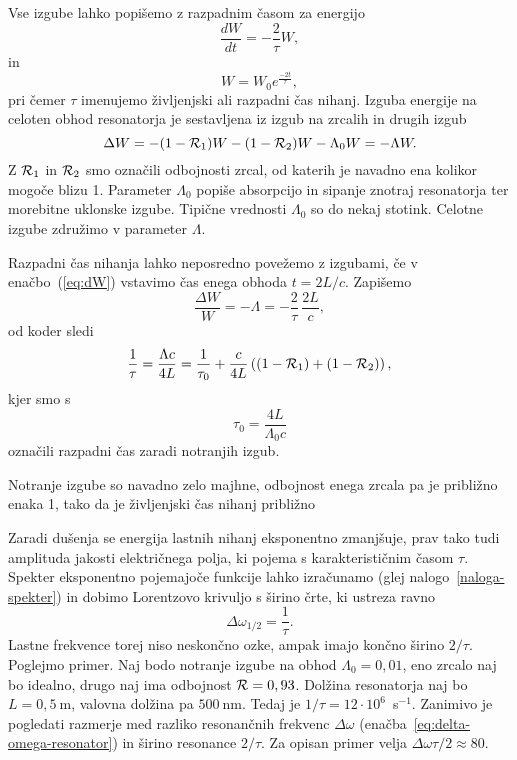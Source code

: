 Vse izgube lahko popišemo z razpadnim časom za energijo 
\begin{equation}
\frac{dW}{dt}=-\frac{2}{\tau}W,
\label{eq:dW}
\end{equation}
in 
\begin{equation}
W = W_0 e^{\frac{-2t}{\tau}},
\label{eq:dW1}
\end{equation}
pri čemer $\tau$ imenujemo življenjski ali razpadni čas nihanj.
Izguba energije na celoten obhod resonatorja je
sestavljena iz izgub na zrcalih in drugih izgub
\begin{equation}
\Delta W = -(1-{\cal R}_{1})W-(1-{\cal R}_{2})W -\Lambda_{0} W = -\Lambda W.
\label{eq:Lambda}
\end{equation}
Z ${\cal R}_{1}$ in ${\cal R}_{2}$ smo označili odbojnosti zrcal, od katerih je navadno ena
kolikor mogoče blizu 1. Parameter $\Lambda_{0}$ popiše absorpcijo in
sipanje znotraj resonatorja ter morebitne uklonske izgube. Tipične vrednosti 
$\Lambda_0$ so do nekaj stotink. Celotne izgube združimo v parameter $\Lambda$. 

Razpadni čas nihanja lahko neposredno povežemo z izgubami, če v enačbo~(\ref{eq:dW})
vstavimo čas enega obhoda $t=2L/c$. Zapišemo
\begin{equation}
\frac{\Delta W}{W}= -\Lambda = -\frac{2}{\tau}\, \frac{2L}{c},
\end{equation}
od koder sledi
\begin{equation}
\frac{1}{\tau}=\frac{\Lambda c}{4L}=\frac{1}{\tau_{0}}+\frac{c}{4L}\left((1-{\cal R}_{1})
+(1-{\cal R}_{2})\right),
\label{taulambda}
\end{equation}
kjer smo s 
\begin{equation}
\tau_{0}=\frac{4L}{\Lambda_0 c}
\end{equation}
označili razpadni čas zaradi notranjih izgub. 

Notranje izgube so navadno zelo majhne, odbojnost enega zrcala
pa je približno enaka 1, tako da je življenjski čas nihanj približno

Zaradi dušenja se energija lastnih nihanj eksponentno zmanjšuje, prav tako tudi
amplituda jakosti električnega polja, ki pojema s karakterističnim časom $\tau$. 
Spekter eksponentno pojemajoče funkcije lahko izračunamo
(glej nalogo~\ref{naloga-spekter}) in dobimo Lorentzovo krivuljo 
s širino črte, ki ustreza ravno
\begin{equation}
\Delta\omega_{1/2}=\frac{1}{\tau}.
\label{3.26}
\end{equation}
Lastne frekvence torej niso neskončno ozke, ampak imajo končno širino $2/\tau$.
Poglejmo primer. Naj bodo notranje izgube na obhod $\Lambda_0=0,01$,
eno zrcalo naj bo idealno, drugo naj ima odbojnost ${\cal R}=0,93$. Dolžina
resonatorja naj bo $L=0,5~\si{\metre}$, valovna dolžina pa $500~\si{\nano\metre}$. Tedaj
je $1/\tau=12\cdot10^{6}$~s$^{-1}$. Zanimivo je pogledati razmerje med 
razliko resonančnih frekvenc $\Delta \omega$ 
(enačba~\ref{eq:delta-omega-resonator}) in širino resonance $2/\tau$. 
Za opisan primer velja $\Delta\omega\tau/2 \approx 80$.

